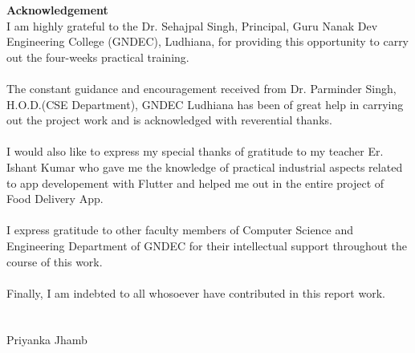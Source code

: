{\Huge \centering \textbf{Acknowledgement}\\}
\vspace{0.5in}
I am highly grateful to the Dr. Sehajpal Singh, Principal, Guru Nanak Dev Engineering College (GNDEC), Ludhiana, for providing this opportunity to carry out the four-weeks
practical training. \\\\
The constant guidance and encouragement received from Dr. Parminder Singh, H.O.D.(CSE
Department), GNDEC Ludhiana has been of great help in carrying out the project work and is acknowledged with reverential thanks.\\\\
I would also like to express my special thanks of gratitude to my teacher Er.  Ishant Kumar who gave me  the knowledge of practical industrial aspects related to  app developement with Flutter and  helped  me  out  in  the  entire  project  of Food Delivery App.\\\\
I express gratitude to other faculty members of Computer Science and Engineering Department
of GNDEC for their intellectual support throughout the course of this work.\\\\
Finally, I am indebted to all whosoever have contributed in this report work.
\\
\\\\
Priyanka Jhamb
\\



\newpage
